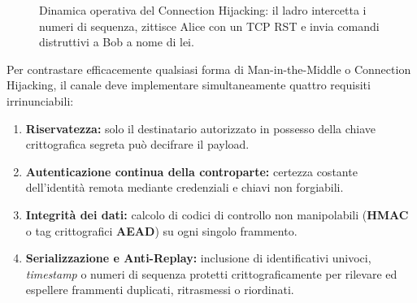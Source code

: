 \documentclass[../../main.tex]{subfiles}
\begin{document}
\begin{figure}[htbp]
{%
}
\caption{Dinamica operativa del Connection Hijacking: il ladro intercetta i numeri di sequenza, zittisce Alice con un TCP RST e invia comandi distruttivi a Bob a nome di lei.}
\label{fig:connection_hijacking}
\end{figure}

Per contrastare efficacemente qualsiasi forma di Man-in-the-Middle o Connection Hijacking, il canale deve implementare simultaneamente quattro requisiti irrinunciabili:
\begin{enumerate}
    \item \textbf{Riservatezza:} solo il destinatario autorizzato in possesso della chiave crittografica segreta può decifrare il payload.
    \item \textbf{Autenticazione continua della controparte:} certezza costante dell'identità remota mediante credenziali e chiavi non forgiabili.
    \item \textbf{Integrità dei dati:} calcolo di codici di controllo non manipolabili (\textbf{HMAC} o tag crittografici \textbf{AEAD}) su ogni singolo frammento.
    \item \textbf{Serializzazione e Anti-Replay:} inclusione di identificativi univoci, \textit{timestamp} o numeri di sequenza protetti crittograficamente per rilevare ed espellere frammenti duplicati, ritrasmessi o riordinati.
\end{enumerate}
\end{document}
